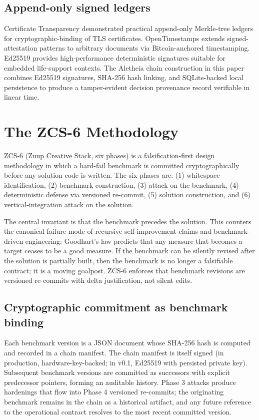 \documentclass[conference]{IEEEtran}
\theoremstyle{definition}
\theoremstyle{plain}
\theoremstyle{remark}
\begin{document}
\subsection{Append-only signed ledgers}

Certificate Transparency \cite{laurie_ct_2014} demonstrated practical append-only Merkle-tree ledgers for cryptographic-binding of TLS certificates. OpenTimestamps \cite{opentimestamps_2018} extends signed-attestation patterns to arbitrary documents via Bitcoin-anchored timestamping. Ed25519 \cite{bernstein_ed25519_2012} provides high-performance deterministic signatures suitable for embedded life-support contexts. The Aletheia chain construction in this paper combines Ed25519 signatures, SHA-256 hash linking, and SQLite-backed local persistence to produce a tamper-evident decision provenance record verifiable in linear time.

\section{The ZCS-6 Methodology}
\label{sec:method}

ZCS-6 (Zuup Creative Stack, six phases) is a falsification-first design methodology in which a hard-fail benchmark is committed cryptographically before any solution code is written. The six phases are: (1) whitespace identification, (2) benchmark construction, (3) attack on the benchmark, (4) deterministic defense via versioned re-commit, (5) solution construction, and (6) vertical-integration attack on the solution.

The central invariant is that the benchmark precedes the solution. This counters the canonical failure mode of recursive self-improvement claims and benchmark-driven engineering: Goodhart's law \cite{goodhart_1975} predicts that any measure that becomes a target ceases to be a good measure. If the benchmark can be silently revised after the solution is partially built, then the benchmark is no longer a falsifiable contract; it is a moving goalpost. ZCS-6 enforces that benchmark revisions are versioned re-commits with delta justification, not silent edits.

\subsection{Cryptographic commitment as benchmark binding}

Each benchmark version is a JSON document whose SHA-256 hash is computed and recorded in a chain manifest. The chain manifest is itself signed (in production, hardware-key-backed; in v0.1, Ed25519 with persisted private key). Subsequent benchmark versions are committed as successors with explicit predecessor pointers, forming an auditable history. Phase 3 attacks produce hardenings that flow into Phase 4 versioned re-commits; the originating benchmark remains in the chain as a historical artifact, and any future reference to the operational contract resolves to the most recent committed version.
\end{document}

